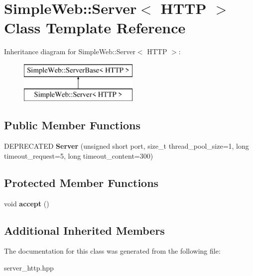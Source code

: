 \hypertarget{a00268}{}\section{Simple\+Web\+:\+:Server$<$ H\+T\+TP $>$ Class Template Reference}
\label{a00268}
Inheritance diagram for Simple\+Web\+:\+:Server$<$ H\+T\+TP $>$\+:\begin{figure}[H]
\begin{center}
\leavevmode
\includegraphics[height=2.000000cm]{a00268}
\end{center}
\end{figure}
\subsection*{Public Member Functions}
\begin{DoxyCompactItemize}
\item 
D\+E\+P\+R\+E\+C\+A\+T\+ED {\bfseries Server} (unsigned short port, size\+\_\+t thread\+\_\+pool\+\_\+size=1, long timeout\+\_\+request=5, long timeout\+\_\+content=300)\hypertarget{a00268_a926e5ebedafc2d17a944698197b7f002}{}\label{a00268_a926e5ebedafc2d17a944698197b7f002}

\end{DoxyCompactItemize}
\subsection*{Protected Member Functions}
\begin{DoxyCompactItemize}
\item 
void {\bfseries accept} ()\hypertarget{a00268_abe9f9de361dcb01541e0302eac21986d}{}\label{a00268_abe9f9de361dcb01541e0302eac21986d}

\end{DoxyCompactItemize}
\subsection*{Additional Inherited Members}


The documentation for this class was generated from the following file\+:\begin{DoxyCompactItemize}
\item 
server\+\_\+http.\+hpp\end{DoxyCompactItemize}
